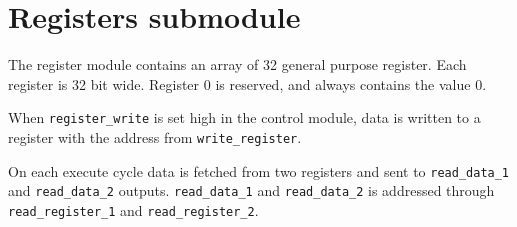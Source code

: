 \section{Registers submodule}
The register module contains an array of 32 general purpose register.
Each register is 32 bit wide.
Register 0 is reserved, and always contains the value 0.

When \texttt{register\_write} is set high in the control module, data is written to a register with the address from \texttt{write\_register}.

On each execute cycle data is fetched from two registers and sent to \texttt{read\_data\_1} and \texttt{read\_data\_2} outputs.
\texttt{read\_data\_1} and \texttt{read\_data\_2} is addressed through \texttt{read\_register\_1} and \texttt{read\_register\_2}.

